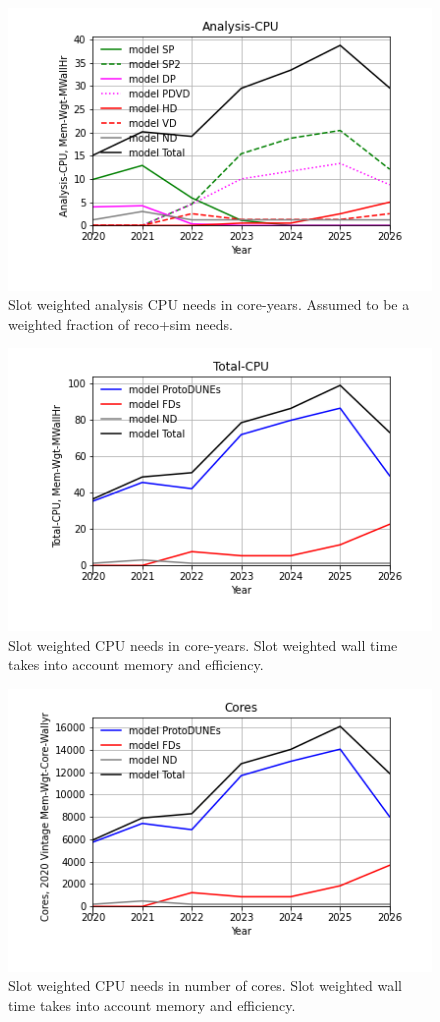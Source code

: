 \begin{figure}[h]
\centering\includegraphics[height=0.4\textwidth]{Parameters_2022-11-21-2026/Parameters_2022-11-21-2026-Analysis-CPU.png}
\caption{Slot weighted analysis CPU needs in core-years. Assumed to be a weighted fraction of reco+sim needs.}
\label{fig:Analysis-CPU}
\end{figure}
\begin{figure}[h]
\centering\includegraphics[height=0.4\textwidth]{Parameters_2022-11-21-2026/Parameters_2022-11-21-2026-Total-CPU.png}
\caption{Slot weighted CPU needs in core-years. Slot weighted wall time takes into account memory and efficiency.}
\label{fig:Total-CPU}
\end{figure}
\begin{figure}[h]
\centering\includegraphics[height=0.4\textwidth]{Parameters_2022-11-21-2026/Parameters_2022-11-21-2026-Cores.png}
\caption{Slot weighted CPU needs in number of cores. Slot weighted wall time takes into account memory and efficiency.}
\label{fig:Cores}
\end{figure}
